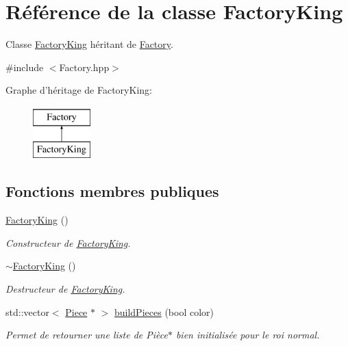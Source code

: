\hypertarget{class_factory_king}{\section{Référence de la classe Factory\-King}
\label{class_factory_king}
}


Classe \hyperlink{class_factory_king}{Factory\-King} héritant de \hyperlink{class_factory}{Factory}.  




{\ttfamily \#include $<$Factory.\-hpp$>$}

Graphe d'héritage de Factory\-King\-:\begin{figure}[H]
\begin{center}
\leavevmode
\includegraphics[height=2.000000cm]{class_factory_king}
\end{center}
\end{figure}
\subsection*{Fonctions membres publiques}
\begin{DoxyCompactItemize}
\item 
\hyperlink{class_factory_king_ad6762ceddcc10d41b5652e17455d3503}{Factory\-King} ()
\begin{DoxyCompactList}\small\item\em Constructeur de \hyperlink{class_factory_king}{Factory\-King}. \end{DoxyCompactList}\item 
\hyperlink{class_factory_king_adbf2005c439f045fb97bdb86147181a7}{$\sim$\-Factory\-King} ()
\begin{DoxyCompactList}\small\item\em Destructeur de \hyperlink{class_factory_king}{Factory\-King}. \end{DoxyCompactList}\item 
std\-::vector$<$ \hyperlink{class_piece}{Piece} $\ast$ $>$ \hyperlink{class_factory_king_a0d5fd0a7340ab7bb50fe63e119c3a3ef}{build\-Pieces} (bool color)
\begin{DoxyCompactList}\small\item\em Permet de retourner une liste de Pièce$\ast$ bien initialisée pour le roi normal. \end{DoxyCompactList}\end{DoxyCompactItemize}


